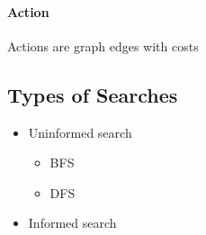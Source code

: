       \paragraph{Action}
      Actions are graph edges with costs

  \subsection{Types of Searches}

    \begin{itemize}
      \item Uninformed search
      \begin{itemize}
        \item BFS
        \item DFS
      \end{itemize}

      \item Informed search
    \end{itemize}
